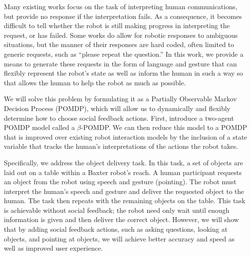 \documentclass[conference]{IEEEtran}
\begin{document}
Many existing works focus on the task of interpreting human communications\citep{tellex11,matuszek12,tellex12,misra14}, but provide no response if the interpretation fails. As a consequence, it becomes difficult to tell whether the robot is still making progress in interpreting the request, or has failed. Some works do allow for robotic responses to ambiguous situations, but the manner of their responses are hard coded, often limited to generic requests, such as ``please repeat the question.'' In this work, we provide a means to generate these requests in the form of language and gesture that can flexibly represent the robot's state as well as inform the human in such a way so that allows the human to help the robot as much as possible. 


We will solve this problem by formulating it as a Partially Observable Markov Decision Process (POMDP)\citep{kaelbling99}, which will allow us to dynamically and flexibly determine how to choose social feedback actions. First, introduce a two-agent POMDP model called a $\beta$-POMDP. We can then reduce this model to a POMDP that is improved over existing robot interaction models by the inclusion of a state variable that tracks the human's interpretations of the actions the robot takes. 

Specifically, we address the object delivery task. In this task, a set of objects are laid out on a table within a Baxter robot's reach. A human participant requests an object from the robot using speech and gesture (pointing). The robot must interpret the human's speech and gesture and deliver the requested object to the human. The task then repeats with the remaining objects on the table. This task is achievable without social feedback; the robot need only wait until enough information is given and then deliver the correct object. However, we will show that by adding social feedback actions, such as asking questions, looking at objects, and pointing at objects, we will achieve better accuracy and speed as well as improved user experience. 
\end{document}
